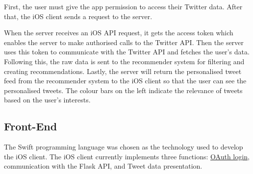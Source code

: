 \documentclass{article}
\begin{document}
First, the user must give the app permission to access their Twitter data. After that, the iOS client sends a request to the server.

When the server receives an iOS API request, it gets the access token which enables the server to make authorised calls to the Twitter API. Then the server uses this token to communicate with the Twitter API and fetches the user's data. Following this, the raw data is sent to the recommender system for filtering and creating recommendations. 
Lastly, the server will return the personalised tweet feed from the recommender system to the iOS client so that the user can see the personalised tweets. The colour bars on the left indicate the relevance of tweets based on the user's interests.


\newpage


\subsection{Front-End}

The Swift programming language was chosen as the technology used to develop the iOS client. The iOS client currently implements three functions: \hyperlink{oauth}{OAuth login}, communication with the Flask API, and Tweet data presentation.
\end{document}
